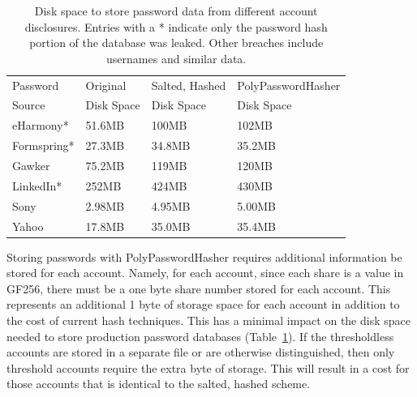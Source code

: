\begin{table}[t]
{\scriptsize
\begin{tabular}{|l|l|l|l|}
\hline
Password & Original & Salted, Hashed & PolyPasswordHasher \\
Source & Disk Space & Disk Space & Disk Space\\
\hline
\hline
eHarmony* & 51.6MB & 100MB & 102MB \\
\hline
Formspring* & 27.3MB & 34.8MB & 35.2MB \\
\hline
Gawker & 75.2MB & 119MB & 120MB \\
\hline
LinkedIn* & 252MB & 424MB & 430MB \\
\hline
Sony & 2.98MB & 4.95MB & 5.00MB  \\
\hline
Yahoo & 17.8MB & 35.0MB & 35.4MB \\
\hline
\end{tabular}
}
\caption{Disk space to store password data from different account disclosures.
Entries with a * indicate only the password hash portion of the database
was leaked.   Other breaches include usernames and similar data.  }
	\label{tab:extrahashcost}  
\end{table}




Storing passwords with PolyPasswordHasher requires additional information be stored
for each account.   Namely, for each account, since each share is a value
in GF256, there must be a one byte share number stored for each account.   
This represents an additional 1 byte of storage space for each account in 
addition to the cost of current hash techniques.   This
has a minimal impact on the disk space needed to store production
password databases (Table~\ref{tab:extrahashcost}).   If the thresholdless 
accounts are stored in a separate file or are
otherwise distinguished, then only threshold accounts require the extra
byte of storage.   This will result in a cost for those accounts that is
identical to the salted, hashed scheme.

